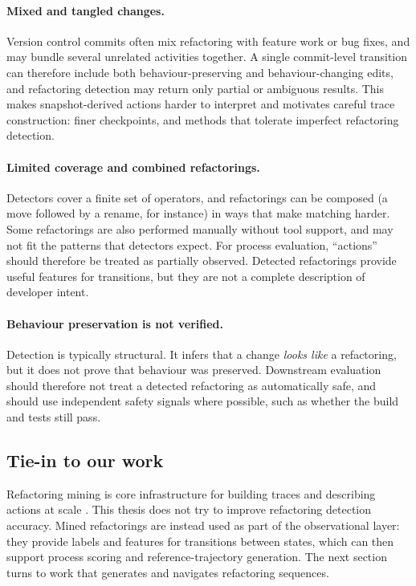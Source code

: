 \paragraph{Mixed and tangled changes.}
Version control commits often mix refactoring with feature work or bug fixes, and may bundle several unrelated activities together. A single commit-level transition can therefore include both behaviour-preserving and behaviour-changing edits, and refactoring detection may return only partial or ambiguous results. This makes snapshot-derived actions harder to interpret and motivates careful trace construction: finer checkpoints, and methods that tolerate imperfect refactoring detection.

\paragraph{Limited coverage and combined refactorings.}
Detectors cover a finite set of operators, and refactorings can be composed (a move followed by a rename, for instance) in ways that make matching harder. Some refactorings are also performed manually without tool support, and may not fit the patterns that detectors expect. For process evaluation, ``actions'' should therefore be treated as partially observed. Detected refactorings provide useful features for transitions, but they are not a complete description of developer intent.

\paragraph{Behaviour preservation is not verified.}
Detection is typically structural. It infers that a change \emph{looks like} a refactoring, but it does not prove that behaviour was preserved. Downstream evaluation should therefore not treat a detected refactoring as automatically safe, and should use independent safety signals where possible, such as whether the build and tests still pass.


\subsection{Tie-in to our work}
Refactoring mining is core infrastructure for building traces and describing actions at scale \cite{alikhanifard2025rminer,silva2017refdiff}. This thesis does not try to improve refactoring detection accuracy. Mined refactorings are instead used as part of the observational layer: they provide labels and features for transitions between states, which can then support process scoring and reference-trajectory generation. The next section turns to work that generates and navigates refactoring sequences.





